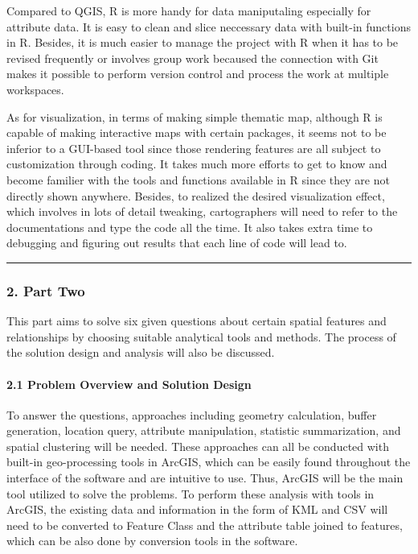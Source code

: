 \documentclass[]{article}
\let\oldparagraph\paragraph
\renewcommand{\paragraph}[1]{\oldparagraph{#1}\mbox{}}
\begin{document}
Compared to QGIS, R is more handy for data maniputaling especially for
attribute data. It is easy to clean and slice neccessary data with
built-in functions in R. Besides, it is much easier to manage the
project with R when it has to be revised frequently or involves group
work becaused the connection with Git makes it possible to perform
version control and process the work at multiple workspaces.

As for visualization, in terms of making simple thematic map, although R
is capable of making interactive maps with certain packages, it seems
not to be inferior to a GUI-based tool since those rendering features
are all subject to customization through coding. It takes much more
efforts to get to know and become familier with the tools and functions
available in R since they are not directly shown anywhere. Besides, to
realized the desired visualization effect, which involves in lots of
detail tweaking, cartographers will need to refer to the documentations
and type the code all the time. It also takes extra time to debugging
and figuring out results that each line of code will lead to.

\begin{center}\rule{0.5\linewidth}{\linethickness}\end{center}

\subsubsection{2. Part Two}\label{part-two}

This part aims to solve six given questions about certain spatial
features and relationships by choosing suitable analytical tools and
methods. The process of the solution design and analysis will also be
discussed.

\paragraph{2.1 Problem Overview and Solution
Design}\label{problem-overview-and-solution-design}

To answer the questions, approaches including geometry calculation,
buffer generation, location query, attribute manipulation, statistic
summarization, and spatial clustering will be needed. These approaches
can all be conducted with built-in geo-processing tools in ArcGIS, which
can be easily found throughout the interface of the software and are
intuitive to use. Thus, ArcGIS will be the main tool utilized to solve
the problems. To perform these analysis with tools in ArcGIS, the
existing data and information in the form of KML and CSV will need to be
converted to Feature Class and the attribute table joined to features,
which can be also done by conversion tools in the software.
\end{document}
